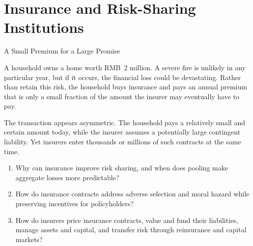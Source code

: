 \chapter{Insurance and Risk-Sharing Institutions}
\label{chap:Insurance_and_Risk_Sharing_Institutions}


\begin{openingcase}{A Small Premium for a Large Promise}

A household owns a home worth RMB~2 million. A severe fire is unlikely in any particular year, but if it occurs, the financial loss could be devastating. Rather than retain this risk, the household buys insurance and pays an annual premium that is only a small fraction of the amount the insurer may eventually have to pay.

The transaction appears asymmetric. The household pays a relatively small and certain amount today, while the insurer assumes a potentially large contingent liability. Yet insurers enter thousands or millions of such contracts at the same time.

\end{openingcase}

\begin{tcolorbox}[
  enhanced,
  colback=FinanceBlue!6,
  colframe=FinanceBlue,
  boxrule=0.6pt,
  sharp corners,
  left=8pt,
  right=8pt,
  top=7pt,
  bottom=7pt,
  before skip=1em,
  after skip=1.6em,
  title=\textbf{Core Questions},
  coltitle=white,
  colbacktitle=FinanceBlue,
  fonttitle=\bfseries,
  attach boxed title to top left={xshift=6pt,yshift=-2mm},
  boxed title style={
    boxrule=0pt,
    sharp corners,
    left=5pt,
    right=5pt,
    top=2pt,
    bottom=2pt
  }
]
\begin{enumerate}[
  leftmargin=*,
  label=\textcolor{FinanceBlue}{\textbf{\arabic*.}},
  itemsep=0.55em,
  topsep=0.2em
]


\item Why can insurance improve risk sharing, and when does pooling make aggregate losses more predictable?

\item How do insurance contracts address adverse selection and moral hazard while preserving incentives for policyholders?

\item How do insurers price insurance contracts, value and fund their liabilities, manage assets and capital, and transfer risk through reinsurance and capital markets?

\end{enumerate}
\end{tcolorbox}

